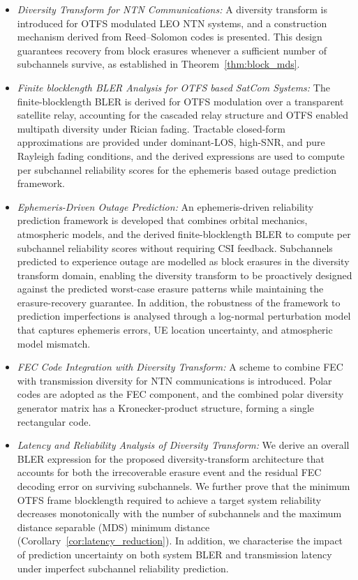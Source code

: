 \documentclass[journal]{IEEEtran}
\begin{document}
\begin{itemize}
\item \textit{Diversity Transform for NTN Communications:}
A diversity transform is introduced for OTFS modulated LEO NTN 
systems, and a construction mechanism derived from Reed--Solomon 
codes is presented. This design guarantees recovery from block erasures whenever a sufficient number of subchannels survive, as established in Theorem~\ref{thm:block_mds}.
\item \textit{Finite blocklength BLER Analysis for OTFS based 
SatCom Systems:}
The finite-blocklength BLER is derived for OTFS modulation over 
a transparent satellite relay, accounting for the cascaded relay 
structure and OTFS enabled multipath diversity under Rician fading. 
Tractable closed-form approximations are provided under 
dominant-LOS, high-SNR, and pure Rayleigh fading conditions, 
and the derived expressions are used to compute per subchannel 
reliability scores for the ephemeris based outage prediction 
framework.
\item \textit{Ephemeris-Driven Outage Prediction:}
An ephemeris-driven reliability prediction framework is developed 
that combines orbital mechanics, atmospheric models, and the 
derived finite-blocklength BLER to compute per subchannel 
reliability scores without requiring CSI 
feedback. Subchannels predicted to experience outage are modelled 
as block erasures in the diversity transform domain, enabling the 
diversity transform to be proactively designed against the 
predicted worst-case erasure patterns while maintaining the erasure-recovery guarantee.  In addition, the robustness of the framework to prediction imperfections is analysed through a log-normal perturbation model that captures ephemeris errors, UE location uncertainty, and atmospheric model mismatch.
\item \textit{FEC Code Integration with Diversity Transform:}
A scheme to combine FEC with transmission diversity for NTN communications is introduced. Polar codes are adopted as the FEC component, and the combined polar diversity generator matrix has a Kronecker-product structure, 
forming a single rectangular code. 
\item \textit{Latency and Reliability Analysis of Diversity Transform:}
We derive an overall BLER expression for the proposed diversity-transform architecture that accounts for both the irrecoverable erasure event and the residual FEC decoding error on surviving subchannels. We further prove that the minimum OTFS frame blocklength required to achieve a target system reliability decreases monotonically with the number of subchannels and the maximum distance separable (MDS) minimum distance (Corollary~\ref{cor:latency_reduction}).  In addition, we characterise the impact of prediction uncertainty on both system BLER and transmission latency under imperfect subchannel reliability prediction.
\end{itemize}
\end{document}
